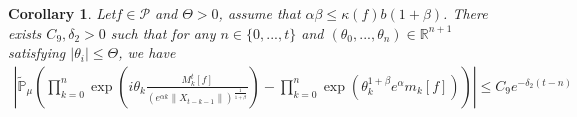 \documentclass[12pt, a4paper]{amsart}
\newtheorem{cor}[thm]{Corollary}
\theoremstyle{definition}
\newtheorem{rem}[thm]{Remark}
\numberwithin{equation}{section}
\begin{document}
\begin{comment}
At last, Using Lemma \ref{lemma28}, on the event $\mathcal{A}^c_{t-k-1}$, we get

\begin{align}
    \left|\mathbb{\tilde{P}}_{\mu}\left([\exp(i\theta \frac {M_k^t[g]}{F_k(X_{t-k-1})})]-\exp(\theta^{1+\beta}e^{\alpha}m_k[g])\right)\mathbf{1}_{\mathcal{A}^c_{t-k-1}}\right|&\leq e^c\mathbb{\tilde{P}}_{\mu}(\mathcal{A}^c_{t-k-1})\nonumber\\
    &\leq C_{14} e^{-\delta_1(t-k)},\label{lemma33q}
\end{align}
Combine with \eqref{lemma31q},\eqref{lemma32q} and \eqref{lemma33q}, by letting $t \rightarrow \infty$, We obtain the desired result.

\end{comment}
\begin{comment}

Now we will prove the claim mentioned in Lemma \ref{lemma31}.
\begin{proof}[Proof of claim:] Let $\sigma_t^2=\sigma^2(1-e^{-2bt})$, then we get
\begin{align*}
    T_t f(x)= \int_{\mathbb{R}^d}f(y)\left(\frac{b}{\pi \sigma_t^2}\right)^{\frac{d}{2}} \exp\left(-\frac{b}{\sigma_t^2}(y-xe^{-bt})^2\right)dy=f\ast\varphi_t(xe^{-bt})
\end{align*}
where $\varphi_t(x)=\left(\frac{b}{\pi \sigma_t^2}\right)^{\frac{d}{2}} \exp\left(-\frac{b}{\sigma_t^2}x^2\right)$, which is belong to $C^{\infty}$. Hence $  T_t f(x)$ also belong to $C^{\infty}$. On the other hand, by calculating, we get
\begin{align*}
    \frac{\partial}{\partial x_i}T_t f(x)&=\int_{\mathbb{R}^d}f(y)\frac{\partial}{\partial x_i}\left(\varphi_t(xe^{-bt}-y)\right)dy\\
    &=e^{-bt}\int_{\mathbb{R}^d}\frac{\partial \varphi_t}{\partial x_i}(y)f(xe^{-bt}-y)dy\\
    &=\frac{-2bx_i}{\sigma_t^2}e^{-bt}T_t f(x)\in \mathcal{P}.
\end{align*}
\end{proof}


\begin{rem}
   i) For any $k\in\mathbb{N}$, $e^{\theta^{1+\beta}e^{\alpha}m_k[g]}$ is the characteristic function of some $1+\beta$-stable distribution, hence $|e^{\theta^{1+\beta}e^{\alpha}m_k[g]}|\leq 1$.
\end{rem}
    
\end{comment}
\begin{cor}\label{corollary31}
Let$f\in \mathcal{P}$ and $\Theta>0$, assume that $\alpha\beta\leq\kappa(f)b(1+\beta)$. There exists $C_9,\delta_2>0$ such that for any $n \in \{0,...,t\}$ and $(\theta_0,...,\theta_n)\in \mathbb{R}^{n+1}$ satisfying $|\theta_i|\leq \Theta$, we have
\begin{align}
\label{32corollary}
    \left|\mathbb{\tilde{P}}_{\mu}\left(\prod_{k=0}^n\exp(i\theta_k \frac {M_k^t[f]}{(e^{\alpha k}\|X_{t-k-1}\|)^\frac{1}{1+\beta}})-\prod_{k=0}^n\exp(\theta_k^{1+\beta}e^{\alpha}m_k[f])\right)\right|\leq C_9 e^{-\delta_2(t-n)}
\end{align}
\end{cor}
\end{document}
